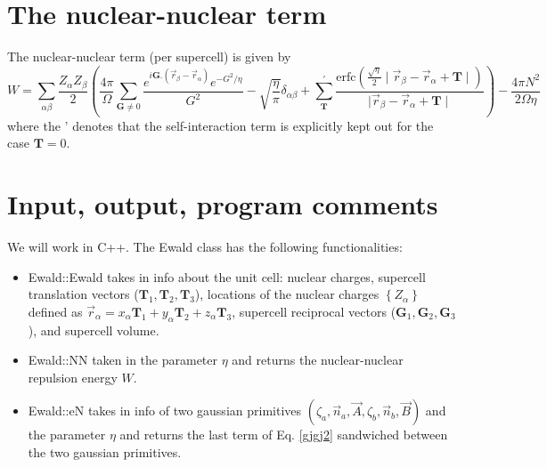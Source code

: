 \documentclass[11pt,a4paper]{article}
\begin{document}
\section{The nuclear-nuclear term}
The nuclear-nuclear term (per supercell) is given by
\begin{equation}
W = \sum\limits_{\alpha\beta} \frac{Z_{\alpha}Z_{\beta}}{2} \left( \frac{4\pi}{\Omega} \sum\limits_{\mathbf{G} \neq 0} \frac{e^{i \mathbf{G}.(\vec{r}_{\beta} - \vec{r}_{\alpha})} e^{-G^2/\eta}}{G^2} - \sqrt{\frac{\eta}{\pi}} \delta_{\alpha\beta} + \sum\limits_{\mathbf{T}}^{'} \frac{\text{erfc}\left( \frac{\sqrt{\eta}}{2} \mid \vec{r}_{\beta} - \vec{r}_{\alpha} + \mathbf{T} \mid \right)}{\mid \vec{r}_{\beta} - \vec{r}_{\alpha} + \mathbf{T} \mid}  \right) - \frac{4 \pi N^2}{2 \Omega \eta} \label{gjgj3}
\end{equation}
where the ' denotes that the self-interaction term is explicitly kept out for the case $\mathbf{T} = 0$.
\section{Input, output, program comments}
We will work in C++. The Ewald class has the following functionalities:
\begin{itemize}
\item Ewald::Ewald takes in info about the unit cell: nuclear charges, supercell translation vectors ($\mathbf{T}_1, \mathbf{T}_2,\mathbf{T}_3$), locations of the nuclear charges $\left\{ Z_{\alpha} \right\}$ defined as $\vec{r}_{\alpha} = x_{\alpha} \mathbf{T}_1 + y_{\alpha} \mathbf{T}_2 + z_{\alpha} \mathbf{T}_3$, supercell reciprocal vectors ($\mathbf{G}_1,\mathbf{G}_2,\mathbf{G}_3$), and supercell volume.
\item Ewald::NN taken in the parameter $\eta$ and returns the nuclear-nuclear repulsion energy $W$.
\item Ewald::eN takes in info of two gaussian primitives $(\zeta_a,\vec{n}_a,\vec{A},\zeta_b,\vec{n}_b,\vec{B})$ and the parameter $\eta$ and returns the last term of Eq. \eqref{gjgj2} sandwiched between the two gaussian primitives.
\end{itemize}
\end{document}
